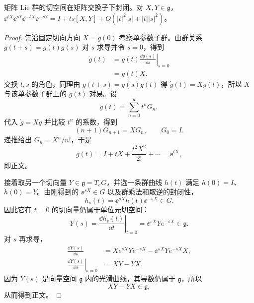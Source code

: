 \begin{proposition}
矩阵 Lie 群的切空间在矩阵交换子下封闭。对 $X,Y\in\mathfrak g$，$\ee^{tX}\ee^{sY}\ee^{-tX}\ee^{-sY}=I+ts[X,Y]+O(|t|^2|s|+|t||s|^2)$。
\end{proposition}
\begin{proof}
先沿固定切向方向 $X=\dot g(0)$ 考察单参数子群。由群关系 $g(t+s)=g(t)g(s)$ 对 $s$ 求导并令 $s=0$，得到
\begin{align*}
 \dot g(t)
 &=g(t)\left.\frac{\dd g(s)}{\dd s}\right|_{s=0}\\
 &=g(t)X.
\end{align*}
交换 $t,s$ 的角色，同理由 $g(t+s)=g(s)g(t)$ 得 $\dot g(t)=Xg(t)$，所以 $X$ 与该单参数子群上的 $g(t)$ 对易。设
\begin{equation*}
 g(t)=\sum_{n=0}^{\infty}t^nG_n,
\end{equation*}
代入 $\dot g=Xg$ 并比较 $t^n$ 的系数，得到
\begin{equation*}
 (n+1)G_{n+1}=XG_n,\qquad G_0=I.
\end{equation*}
递推给出 $G_n=X^n/n!$，于是
\begin{equation*}
 g(t)=I+tX+\frac{t^2X^2}{2!}+\cdots=\ee^{tX},
\end{equation*}
即正文。

接着取另一个切向量 $Y\in\mathfrak g=T_eG$，并选一条群曲线 $h(t)$ 满足 $h(0)=I$、$\dot h(0)=Y$。由刚得到的 $\ee^{sX}\in G$ 以及群乘法和取逆的封闭性，
\begin{equation*}
 h_s(t)=\ee^{sX}h(t)\ee^{-sX}\in G.
\end{equation*}
因此它在 $t=0$ 的切向量仍属于单位元切空间：
\begin{equation*}
 Y(s)=\left.\frac{\dd h_s(t)}{\dd t}\right|_{t=0}
 =\ee^{sX}Ye^{-sX}\in\mathfrak g.
\end{equation*}
对 $s$ 再求导，
\begin{align*}
 \frac{\dd Y(s)}{\dd s}
 &=Xe^{sX}Ye^{-sX}-\ee^{sX}Ye^{-sX}X,\\
 \left.\frac{\dd Y(s)}{\dd s}\right|_{s=0}
 &=XY-YX.
\end{align*}
因为 $Y(s)$ 是向量空间 $\mathfrak g$ 内的光滑曲线，其导数仍属于 $\mathfrak g$，所以
\begin{equation*}
 XY-YX\in\mathfrak g,
\end{equation*}
从而得到正文。
\end{proof}

